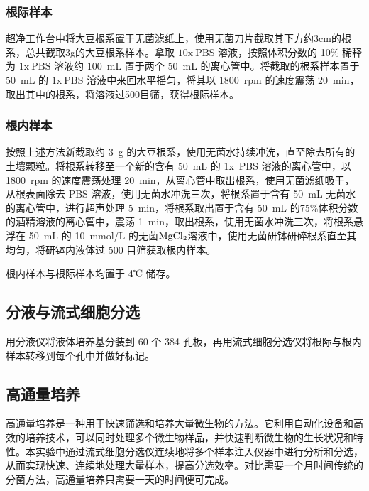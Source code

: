 \documentclass{ctexart}
\begin{document}
    \subsubsection{根际样本}
        \qquad 超净工作台中将大豆根系置于无菌滤纸上，使用无菌刀片截取其下方约3cm的根系，总共截取3g的大豆根系样本。拿取 $\mathrm{10x~PBS}$ 溶液，按照体积分数的 10\% 稀释为 $\mathrm{1x~ PBS}$ 溶液约 100~mL 置于两个 50~mL 的离心管中。将截取的根系样本置于 50~mL 的 $\mathrm{1x~ PBS}$ 溶液中来回水平摇匀，将其以 1800~rpm 的速度震荡 20~min，取出其中的根系，将溶液过500目筛，获得根际样本。

    \subsubsection{根内样本}
        \qquad 按照上述方法新截取约 3~g 的大豆根系，使用无菌水持续冲洗，直至除去所有的土壤颗粒。将根系转移至一个新的含有 50~mL 的 1x~PBS 溶液的离心管中，以 1800~rpm 的速度震荡处理 20~min，从离心管中取出根系，使用无菌滤纸吸干，从根表面除去 PBS 溶液，使用无菌水冲洗三次，将根系置于含有 50~mL 无菌水的离心管中，进行超声处理 5~min，将根系取出置于含有 50~mL 的75\%体积分数的酒精溶液的离心管中，震荡 1~min，取出根系，使用无菌水冲洗三次，将根系悬浮在 50~mL 的 10~mmol/L 的无菌$\ce{MgCl2}$溶液中，使用无菌研钵研碎根系直至其均匀，将研钵内液体过 500 目筛获取根内样本。

        \qquad 根内样本与根际样本均置于 4℃ 储存。

    \subsection{分液与流式细胞分选}

    \qquad 用分液仪将液体培养基分装到 60 个 384 孔板，再用流式细胞分选仪将根际与根内样本转移到每个孔中并做好标记。

    \subsection{高通量培养}
    \qquad 高通量培养是一种用于快速筛选和培养大量微生物的方法。它利用自动化设备和高效的培养技术，可以同时处理多个微生物样品，并快速判断微生物的生长状况和特性。本实验中通过流式细胞分选仪连续地将多个样本注入仪器中进行分析和分选，从而实现快速、连续地处理大量样本，提高分选效率。对比需要一个月时间传统的分菌方法，高通量培养只需要一天的时间便可完成。
\end{document}
